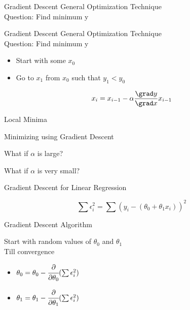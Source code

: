 \documentclass{beamer}
\begin{document}
\begin{frame}{Gradient Descent}
    General Optimization Technique\\
    Question: Find minimum y
\end{frame}

\begin{frame}{Gradient Descent}
    General Optimization Technique\\
    Question: Find minimum y
    \begin{itemize}
        \item Start with some $x_{0}$
        \item Go to $x_{1}$ from $x_{0} $ such that $y_{1}< y_{0}$
    \end{itemize}
    
    \begin{equation*}
        x_{i} = x_{i-1} - \alpha\frac{\grad y }{\grad x} x_{i-1}
    \end{equation*}
    
\end{frame}

\begin{frame}{Local Minima}
    
\end{frame}


\begin{frame}{Minimizing using Gradient Descent}
    

    
\end{frame}


\begin{frame}{What if $\alpha$ is large?}
    
\end{frame}


\begin{frame}{What if $\alpha$ is very small?}
    
\end{frame}

\begin{frame}{Gradient Descent for Linear Regression}

\begin{equation*}
    \sum \epsilon_{i}^{2} = \sum (y_{i} - (\theta_{0} + \theta_{1}x_{i}))^{2}
\end{equation*}

\end{frame}

\begin{frame}{Gradient Descent Algorithm}
    
    Start with random values of $\theta_{0}$ and $\theta_{1}$\\
    Till convergence
    \begin{itemize}
        \item $\theta_{0} = \theta_{0} - \cfrac{\partial}{\partial \theta_{0}} (\sum \epsilon_{i}^{2}) $
        \item $\theta_{1} = \theta_{1} - \cfrac{\partial}{\partial \theta_{1}} (\sum \epsilon_{i}^{2}) $
    \end{itemize}
    
    
\end{frame}
\end{document}
